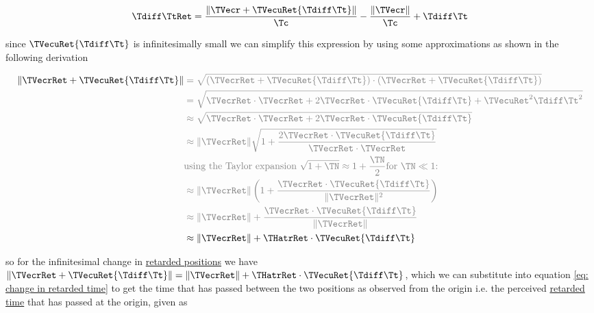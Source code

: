 \begin{equation}
	\label{eq: change in retarded time}
	\Tdiff \TtRet  =   \frac{\|\TVecr  + \TVecuRet  {\Tdiff \Tt } \|}{\Tc } -  \frac{\|\TVecr \|}{\Tc } + \Tdiff \Tt
\end{equation}

since $\TVecuRet  {\Tdiff \Tt } $ is infinitesimally small we can simplify this expression by using some approximations as shown in the following derivation

\begin{equation}
	\begin{aligned}
		\|\TVecrRet  + \TVecuRet  {\Tdiff \Tt } \| & \color{gray} =  \sqrt{(\TVecrRet  + \TVecuRet  {\Tdiff \Tt } ) \cdot (\TVecrRet  + \TVecuRet  {\Tdiff \Tt } )}                                       \\
		                                   & \color{gray} = \sqrt{\TVecrRet  \cdot \TVecrRet  + 2 \TVecrRet  \cdot \TVecuRet  {\Tdiff \Tt }  + \TVecuRet^2  {\Tdiff \Tt }^2  } \\
		                                   & \color{gray} \approx \sqrt{\TVecrRet  \cdot \TVecrRet  + 2 \TVecrRet  \cdot \TVecuRet  {\Tdiff \Tt }  }                                 \\
		                                   & \color{gray} \approx \|\TVecrRet \| \sqrt{1 + \frac{2 \TVecrRet  \cdot \TVecuRet  {\Tdiff \Tt }  }{\TVecrRet  \cdot \TVecrRet  } }     \\
		                                   & \color{gray} \text{using the Taylor expansion $\sqrt{1 + \TN } \approx 1 + \frac{\TN }{2} \text{for } \TN  \ll 1$:}                           \\
		                                   & \color{gray} \approx \|\TVecrRet \| \left(1 + \frac{\TVecrRet  \cdot \TVecuRet  {\Tdiff \Tt }  }{\|\TVecrRet \|^2}\right)               \\
		                                   & \color{gray} \approx \|\TVecrRet \|  + \frac{\TVecrRet  \cdot \TVecuRet  {\Tdiff \Tt }  }{\|\TVecrRet \|}                               \\
		                                   & \approx \|\TVecrRet \|  + \THatrRet   \cdot \TVecuRet  {\Tdiff \Tt }
	\end{aligned}
\end{equation}

so for the infinitesimal change in \hyperlink{def-retarded-position}{retarded positions} we have $\|\TVecrRet  + \TVecuRet  {\Tdiff \Tt } \|= \|\TVecrRet \|   + \THatrRet   \cdot \TVecuRet  {\Tdiff \Tt } $, which we can substitute into equation \eqref{eq: change in retarded time} to get the time that has passed between the two positions as observed from the origin i.e. the perceived \hyperlink{def-retarded-time}{retarded time} that has passed at the origin, given as

